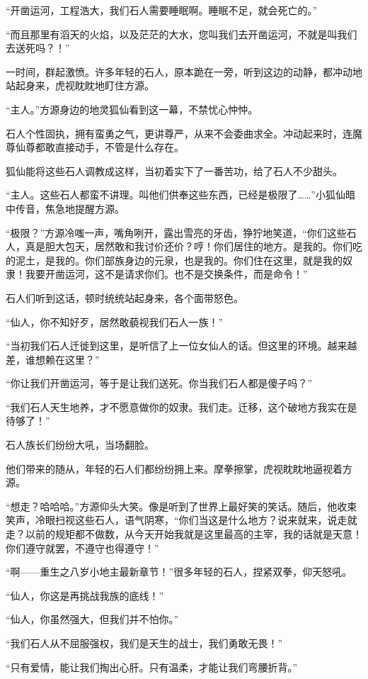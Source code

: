 \begin{this_body}
“开凿运河，工程浩大，我们石人需要睡眠啊。睡眠不足，就会死亡的。”

“而且那里有滔天的火焰，以及茫茫的大水，您叫我们去开凿运河，不就是叫我们去送死吗？！”

一时间，群起激愤。许多年轻的石人，原本跪在一旁，听到这边的动静，都冲动地站起身来，虎视眈眈地盯住方源。

“主人。”方源身边的地灵狐仙看到这一幕，不禁忧心忡忡。

石人个性固执，拥有蛮勇之气，更讲尊严，从来不会委曲求全。冲动起来时，连魔尊仙尊都敢直接动手，不管是什么存在。

狐仙能将这些石人调教成这样，当初着实下了一番苦功，给了石人不少甜头。

“主人。这些石人都蛮不讲理。叫他们供奉这些东西，已经是极限了……”小狐仙暗中传音，焦急地提醒方源。

“极限？”方源冷嗤一声，嘴角咧开，露出雪亮的牙齿，狰狞地笑道，“你们这些石人，真是胆大包天，居然敢和我讨价还价？哼！你们居住的地方。是我的。你们吃的泥土，是我的。你们部族身边的元泉，也是我的。你们住在这里，就是我的奴隶！我要开凿运河，这不是请求你们。也不是交换条件，而是命令！”

石人们听到这话，顿时统统站起身来，各个面带怒色。

“仙人，你不知好歹，居然敢藐视我们石人一族！”

“当初我们石人迁徙到这里，是听信了上一位女仙人的话。但这里的环境。越来越差，谁想赖在这里？”

“你让我们开凿运河，等于是让我们送死。你当我们石人都是傻子吗？”

“我们石人天生地养，才不愿意做你的奴隶。我们走。迁移，这个破地方我实在是待够了！”

石人族长们纷纷大吼，当场翻脸。

他们带来的随从，年轻的石人们都纷纷拥上来。摩拳擦掌，虎视眈眈地逼视着方源。

“想走？哈哈哈。”方源仰头大笑。像是听到了世界上最好笑的笑话。随后，他收束笑声，冷眼扫视这些石人，语气阴寒，“你们当这是什么地方？说来就来，说走就走？以前的规矩都不做数，从今天开始我就是这里最高的主宰，我的话就是天意！你们遵守就罢，不遵守也得遵守！”

“啊——重生之八岁小地主最新章节！”很多年轻的石人，捏紧双拳，仰天怒吼。

“仙人，你这是再挑战我族的底线！”

“仙人，你虽然强大，但我们并不怕你。”

“我们石人从不屈服强权，我们是天生的战士，我们勇敢无畏！”

“只有爱情，能让我们掏出心肝。只有温柔，才能让我们弯腰折背。”


\end{this_body}
